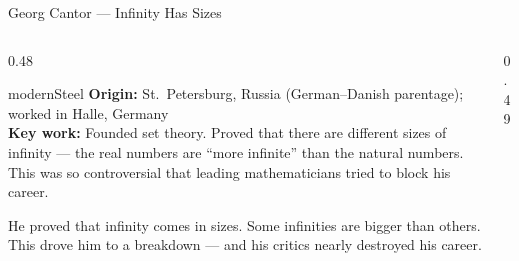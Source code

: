 \begin{frame}[shrink=24]{Georg Cantor --- Infinity Has Sizes}

  \begin{columns}[T]
    \begin{column}{0.48\textwidth}
      \begin{personbox}{modernSteel}
        \textbf{Origin:} St.\ Petersburg, Russia (German--Danish parentage);
        worked in Halle, Germany\\[3pt]
        \textbf{Key work:} Founded \alert{set theory}. Proved that there
        are different sizes of infinity --- the real numbers are ``more
        infinite'' than the natural numbers. This was so controversial
        that leading mathematicians tried to block his career.
      \end{personbox}

      \vspace{0.4em}
      \begin{insightbox}
        He proved that infinity comes in sizes. Some infinities are bigger
        than others. This drove him to a breakdown --- and his critics
        nearly destroyed his career.
      \end{insightbox}
    \end{column}

    \begin{column}{0.49\textwidth}
    \end{column}
  \end{columns}

\end{frame}

